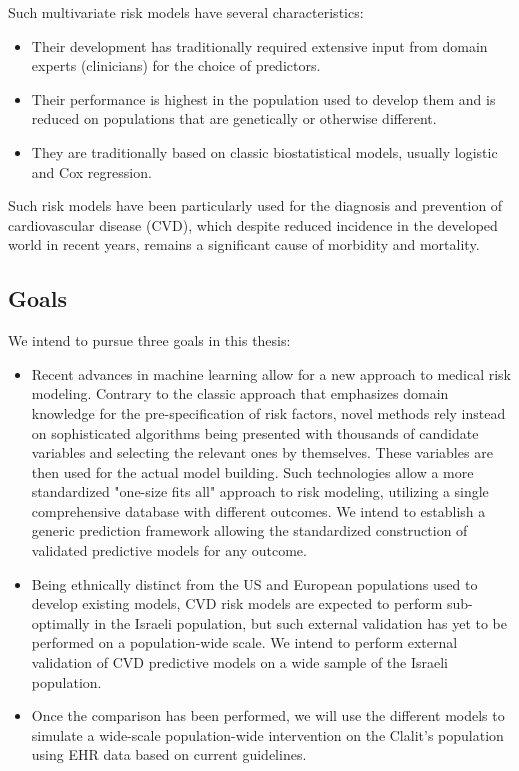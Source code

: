 \documentclass[a4paper,12pt]{article}
\begin{document}
		Such multivariate risk models have several characteristics:
		\begin{itemize}
			\item Their development has traditionally required extensive input from domain experts (clinicians) for the choice of predictors.
			\item Their performance is highest in the population used to develop them and is reduced on populations that are genetically or otherwise different\cite{DAgostino2001,Bastuji-Garin2002,DeFilippis2015}.
			\item They are traditionally based on classic biostatistical models, usually logistic and Cox regression.
		\end{itemize}
	
		Such risk models have been particularly used for the diagnosis and prevention of cardiovascular disease (CVD), which despite reduced incidence in the developed world in recent years\cite{Koton2014,Vangen-Loenne2017}, remains a significant cause of morbidity and mortality\cite{ODonnell2016}.

		\subsection{Goals}
		We intend to pursue three goals in this thesis:
		\begin{itemize}
			\item Recent advances in machine learning allow for a new approach to medical risk modeling\cite{Obermeyer2016}. Contrary to the classic approach that emphasizes domain knowledge for the pre-specification of risk factors, novel methods rely instead on sophisticated algorithms being presented with thousands of candidate variables and selecting the relevant ones by themselves. These variables are then used for the actual model building\cite{Weng2017}. Such technologies allow a more standardized "one-size fits all" approach to risk modeling, utilizing a single comprehensive database with different outcomes\cite{Rajkomar2018}. We intend to establish a generic prediction framework allowing the standardized construction of validated predictive models for any outcome.
			\item Being ethnically distinct from the US and European populations used to develop existing models, CVD risk models are expected to perform sub-optimally in the Israeli population, but such external validation has yet to be performed on a population-wide scale\cite{Lovis2015}. We intend to perform external validation of CVD predictive models on a wide sample of the Israeli population.
			\item Once the comparison has been performed, we will use the different models to simulate a wide-scale population-wide intervention on the Clalit's population using EHR data based on current guidelines\cite{Goff2014}.
		\end{itemize}
	
\end{document}
